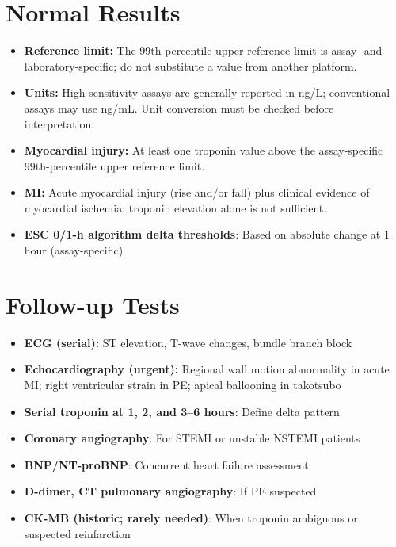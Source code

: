 \section*{Normal Results}
\begin{itemize}
  \item \textbf{Reference limit:} The 99th-percentile upper reference limit is assay- and laboratory-specific; do not substitute a value from another platform.
  \item \textbf{Units:} High-sensitivity assays are generally reported in ng/L; conventional assays may use ng/mL. Unit conversion must be checked before interpretation.
  \item \textbf{Myocardial injury:} At least one troponin value above the assay-specific 99th-percentile upper reference limit.
  \item \textbf{MI:} Acute myocardial injury (rise and/or fall) plus clinical evidence of myocardial ischemia; troponin elevation alone is not sufficient.
  \item \textbf{ESC 0/1-h algorithm delta thresholds}: Based on absolute change at 1 hour (assay-specific)
\end{itemize}

\section*{Follow-up Tests}
\begin{itemize}
  \item \textbf{ECG (serial):} ST elevation, T-wave changes, bundle branch block
  \item \textbf{Echocardiography (urgent):} Regional wall motion abnormality in acute MI; right ventricular strain in PE; apical ballooning in takotsubo
  \item \textbf{Serial troponin at 1, 2, and 3--6 hours}: Define delta pattern
  \item \textbf{Coronary angiography}: For STEMI or unstable NSTEMI patients
  \item \textbf{BNP/NT-proBNP}: Concurrent heart failure assessment
  \item \textbf{D-dimer, CT pulmonary angiography}: If PE suspected
  \item \textbf{CK-MB (historic; rarely needed)}: When troponin ambiguous or suspected reinfarction
\end{itemize}

